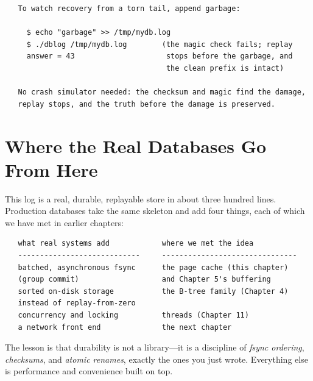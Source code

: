 \begin{verbatim}
   To watch recovery from a torn tail, append garbage:

     $ echo "garbage" >> /tmp/mydb.log
     $ ./dblog /tmp/mydb.log        (the magic check fails; replay
     answer = 43                     stops before the garbage, and
                                     the clean prefix is intact)

   No crash simulator needed: the checksum and magic find the damage,
   replay stops, and the truth before the damage is preserved.
\end{verbatim}

\section{Where the Real Databases Go From Here}

This log is a real, durable, replayable store in about three hundred
lines. Production databases take the same skeleton and add four things,
each of which we have met in earlier chapters:

\begin{verbatim}
   what real systems add            where we met the idea
   ----------------------------     -------------------------------
   batched, asynchronous fsync      the page cache (this chapter)
   (group commit)                   and Chapter 5's buffering
   sorted on-disk storage           the B-tree family (Chapter 4)
   instead of replay-from-zero
   concurrency and locking          threads (Chapter 11)
   a network front end              the next chapter
\end{verbatim}

The lesson is that durability is not a library---it is a discipline
of \emph{fsync ordering}, \emph{checksums}, and \emph{atomic
renames}, exactly the ones you just wrote. Everything else is
performance and convenience built on top.

